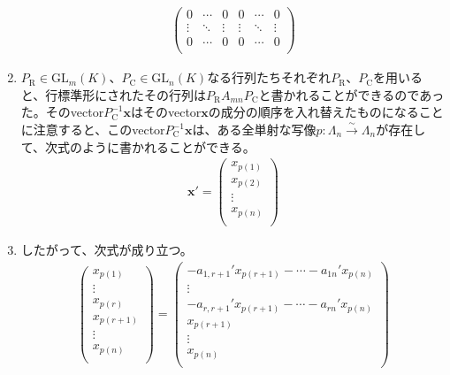 \documentclass[dvipdfmx]{jsarticle}
\begin{document}
\begin{thm*}
\begin{enumerate}
\begin{align*}
\begin{pmatrix}
    0 & \cdots & 0 & 0 & \cdots & 0 \\
     \vdots & \ddots & \vdots & \vdots & \ddots & \vdots \\
    0 & \cdots & 0 & 0 & \cdots & 0 \\
    \end{pmatrix}
    \end{align*}
    \item
      $P_{\mathrm{R}} \in {\mathrm{GL}}_{m}(K)$、$P_{\mathrm{C}} \in {\mathrm{GL}}_{n}(K)$なる行列たちそれぞれ$P_{\mathrm{R}}$、$P_{\mathrm{C}}$を用いると、行標準形にされたその行列は$P_{\mathrm{R}}A_{mn}P_{\mathrm{C}}$と書かれることができるのであった。そのvector$P_{\mathrm{C}}^{- 1}\mathbf{x}$はそのvector$\mathbf{x}$の成分の順序を入れ替えたものになることに注意すると、このvector$P_{\mathrm{C}}^{- 1}\mathbf{x}$は、ある全単射な写像$p:\varLambda_{n}\overset{\sim}{\rightarrow}\varLambda_{n}$が存在して、次式のように書かれることができる。
    \begin{align*}
    \mathbf{x}' = \begin{pmatrix}
    x_{p(1)} \\
    x_{p(2)} \\
     \vdots \\
    x_{p(n)} \\
    \end{pmatrix}
    \end{align*}
    \item
      したがって、次式が成り立つ。
    \begin{align*}
    \begin{pmatrix}
    x_{p(1)} \\
     \vdots \\
    x_{p(r)} \\
    x_{p(r + 1)} \\
     \vdots \\
    x_{p(n)} \\
    \end{pmatrix} = \begin{pmatrix}
     - a_{1,r + 1}'x_{p(r + 1)} - \cdots - a_{1n}'x_{p(n)} \\
     \vdots \\
     - a_{r,r + 1}'x_{p(r + 1)} - \cdots - a_{rn}'x_{p(n)} \\
    x_{p(r + 1)} \\
     \vdots \\
    x_{p(n)} \\
    \end{pmatrix}
    \end{align*}

\end{enumerate}
\end{thm*}
\end{document}
